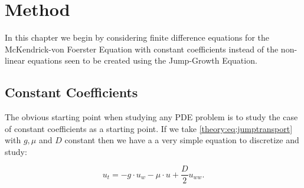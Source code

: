 \documentclass[../main]{subfiles}
\begin{document}
  \chapter{Method}\label{chapter:method}

  In this chapter we begin by considering finite difference equations for the McKendrick-von Foerster Equation with constant coefficients instead of the non-linear equations seen to be created using the Jump-Growth Equation.

  \section{Constant Coefficients}
  The obvious starting point when studying any PDE problem is to study the case of constant coefficients as a starting point. If we take \autoref{theory:eq:jumptransport} with $g, \mu$ and $D$ constant then we have a a very simple equation to discretize and study:

  \begin{equation}
    u_t = - g \cdot u_w - \mu \cdot u + \frac{D}{2} u_{ww}.
  \end{equation}
\end{document}
